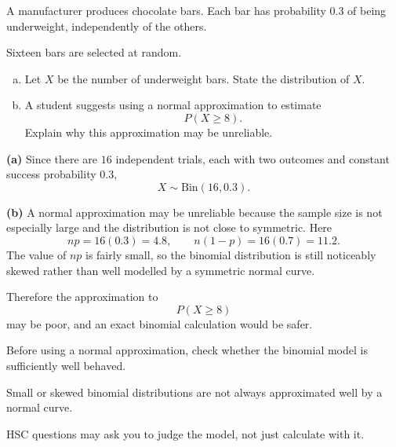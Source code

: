 \begin{problem}
A manufacturer produces chocolate bars. Each bar has probability $0.3$ of being underweight, independently of the others.

Sixteen bars are selected at random.
\begin{enumerate}[(a)]
  \item Let $X$ be the number of underweight bars. State the distribution of $X$.
  \item A student suggests using a normal approximation to estimate
  \[
  P(X\ge 8).
  \]
  Explain why this approximation may be unreliable.
\end{enumerate}
\end{problem}

\begin{solution}
\textbf{(a)} Since there are $16$ independent trials, each with two outcomes and constant success probability $0.3$,
\[
X\sim \mathrm{Bin}(16,0.3).
\]

\textbf{(b)} A normal approximation may be unreliable because the sample size is not especially large and the distribution is not close to symmetric. Here
\[
np=16(0.3)=4.8,
\qquad
n(1-p)=16(0.7)=11.2.
\]
The value of $np$ is fairly small, so the binomial distribution is still noticeably skewed rather than well modelled by a symmetric normal curve.

Therefore the approximation to
\[
P(X\ge 8)
\]
may be poor, and an exact binomial calculation would be safer.
\end{solution}

\begin{takeaways}
\item Before using a normal approximation, check whether the binomial model is sufficiently well behaved.
\item Small or skewed binomial distributions are not always approximated well by a normal curve.
\item HSC questions may ask you to judge the model, not just calculate with it.
\end{takeaways}
